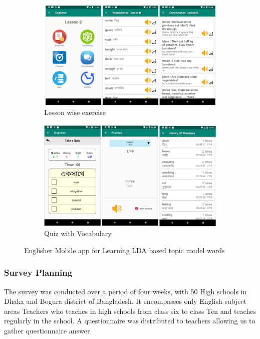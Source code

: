 \documentclass[sn-mathphys,Numbered]{sn-jnl}%
\theoremstyle{thmstyleone}%
\theoremstyle{thmstyletwo}%
\theoremstyle{thmstylethree}%
\begin{document}
\begin{figure}[h!]
\centering
\begin{subfigure}{\textwidth}
	\centering
    \includegraphics[width=\textwidth]{mobile_app_01.png}
    \caption{Lesson wise exercise}
    \label{fig:first}
\end{subfigure}
\hfill
\begin{subfigure}{\textwidth}
	\centering
    \includegraphics[width=\textwidth]{mobile_app_02.png}
    \caption{Quiz with Vocabulary}
    \label{fig:second}
\end{subfigure}
        
\caption{Englisher Mobile app for Learning LDA based topic model words}
\label{fig:figures}
\end{figure}

\subsubsection{Survey Planning}
The survey was conducted over a period of four weeks, with 50 High schools in Dhaka and Bogura district of Bangladesh. It encompasses only English subject areas Teachers who teaches in high schools from class six to class Ten and teaches regularly in the school. A questionnaire was distributed to teachers allowing us to gather questionnaire answer. 
\end{document}
